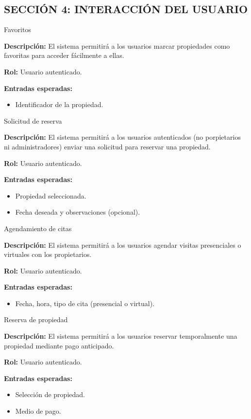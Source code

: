 \subsection*{\uppercase{Sección 4: Interacción del Usuario}}
\begin{requisito}{Favoritos}
	\item \textbf{Descripción:} El sistema permitirá a los usuarios marcar propiedades como favoritas para acceder fácilmente a ellas.
	\item \textbf{Rol:} Usuario autenticado.
	\item \textbf{Entradas esperadas:}
	\begin{itemize}
		\item Identificador de la propiedad.
	\end{itemize}
\end{requisito}
\begin{requisito}{Solicitud de reserva}
	\item \textbf{Descripción:} El sistema permitirá a los usuarios autenticados (no porpietarios ni administradores) enviar una solicitud para reservar una propiedad.
	\item \textbf{Rol:} Usuario autenticado.
	\item \textbf{Entradas esperadas:}
	\begin{itemize}
		\item Propiedad seleccionada.
		\item Fecha deseada y observaciones (opcional).
	\end{itemize}
\end{requisito}
\begin{requisito}{Agendamiento de citas}
	\item \textbf{Descripción:} El sistema permitirá a los usuarios  agendar visitas presenciales o virtuales con los propietarios.
	\item \textbf{Rol:} Usuario autenticado.
	\item \textbf{Entradas esperadas:}
	\begin{itemize}
		\item Fecha, hora, tipo de cita (presencial o virtual).
	\end{itemize}
\end{requisito}
\begin{requisito}{Reserva de propiedad}
	\item \textbf{Descripción:} El sistema permitirá a los usuarios  reservar temporalmente una propiedad mediante pago anticipado.
	\item \textbf{Rol:} Usuario autenticado.
	\item \textbf{Entradas esperadas:}
	\begin{itemize}
		\item Selección de propiedad.
		\item Medio de pago.
	\end{itemize}
\end{requisito}
